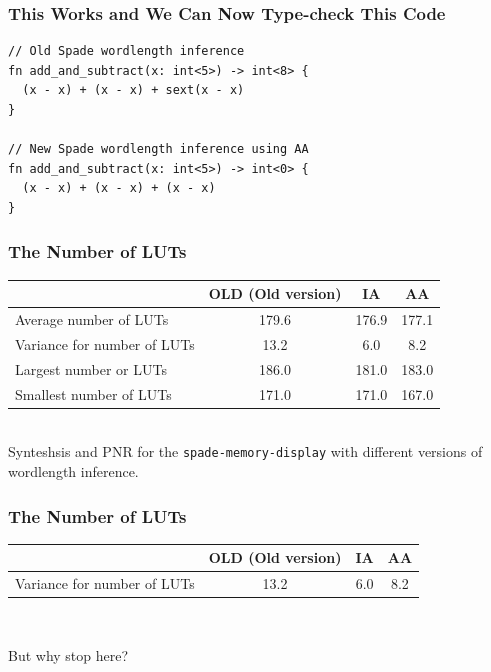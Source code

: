 \documentclass{beamer}
\begin{document}
\begin{frame}[containsverbatim]
\footnotesize
\frametitle{This Works and We Can Now Type-check This Code}
\begin{verbatim}
// Old Spade wordlength inference
fn add_and_subtract(x: int<5>) -> int<8> {
  (x - x) + (x - x) + sext(x - x)
}

// New Spade wordlength inference using AA
fn add_and_subtract(x: int<5>) -> int<0> {
  (x - x) + (x - x) + (x - x)
}
\end{verbatim}
\end{frame}

\begin{frame}[containsverbatim]
\footnotesize
\frametitle{The Number of LUTs}
\begin{table}[h!]
\begin{center}
\begin{tabular}{l | c c c}
  & OLD (Old version) & IA & AA \\
\hline
Average number of LUTs&179.6&176.9 & 177.1 \\
Variance for number of LUTs &13.2&6.0&8.2 \\
Largest number or LUTs&186.0&181.0&183.0 \\
Smallest number of LUTs&171.0&171.0&167.0 \\
\end{tabular}\\[2em]
Synteshsis and PNR for the \verb`spade-memory-display` with different versions of wordlength inference.
\end{center}
\end{table}
\end{frame}

\begin{frame}[containsverbatim]
\footnotesize
\frametitle{The Number of LUTs}
\begin{table}[h!]
\begin{center}
\begin{tabular}{l | c c c}
  & OLD (Old version) & IA & AA \\
\hline
Variance for number of LUTs &13.2&6.0&8.2 \\
\end{tabular}\\[2em]
\end{center}
\end{table}
\end{frame}

\begin{frame}
\begin{center}
\LARGE But why stop here?
\end{center}
\end{frame}
\end{document}
